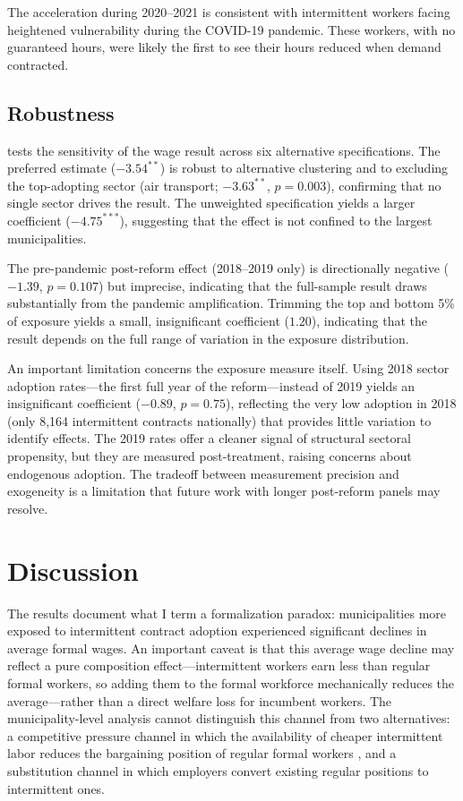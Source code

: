 \documentclass[12pt]{article}
\begin{document}
The acceleration during 2020--2021 is consistent with intermittent workers facing heightened vulnerability during the COVID-19 pandemic. These workers, with no guaranteed hours, were likely the first to see their hours reduced when demand contracted.



\subsection{Robustness}

 tests the sensitivity of the wage result across six alternative specifications. The preferred estimate ($-3.54^{**}$) is robust to alternative clustering and to excluding the top-adopting sector (air transport; $-3.63^{**}$, $p = 0.003$), confirming that no single sector drives the result. The unweighted specification yields a larger coefficient ($-4.75^{***}$), suggesting that the effect is not confined to the largest municipalities.

The pre-pandemic post-reform effect (2018--2019 only) is directionally negative ($-1.39$, $p = 0.107$) but imprecise, indicating that the full-sample result draws substantially from the pandemic amplification. Trimming the top and bottom 5\% of exposure yields a small, insignificant coefficient ($1.20$), indicating that the result depends on the full range of variation in the exposure distribution.

An important limitation concerns the exposure measure itself. Using 2018 sector adoption rates---the first full year of the reform---instead of 2019 yields an insignificant coefficient ($-0.89$, $p = 0.75$), reflecting the very low adoption in 2018 (only 8,164 intermittent contracts nationally) that provides little variation to identify effects. The 2019 rates offer a cleaner signal of structural sectoral propensity, but they are measured post-treatment, raising concerns about endogenous adoption. The tradeoff between measurement precision and exogeneity is a limitation that future work with longer post-reform panels may resolve.



\section{Discussion}

The results document what I term a formalization paradox: municipalities more exposed to intermittent contract adoption experienced significant declines in average formal wages. An important caveat is that this average wage decline may reflect a pure composition effect---intermittent workers earn less than regular formal workers, so adding them to the formal workforce mechanically reduces the average---rather than a direct welfare loss for incumbent workers. The municipality-level analysis cannot distinguish this channel from two alternatives: a competitive pressure channel in which the availability of cheaper intermittent labor reduces the bargaining position of regular formal workers \citep{Manning2003}, and a substitution channel in which employers convert existing regular positions to intermittent ones.
\end{document}
